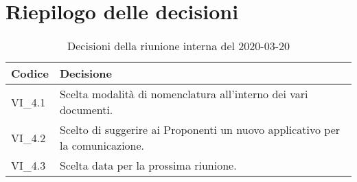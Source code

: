 \section{Riepilogo delle decisioni}
\begin{longtable}{ 
	 >{\centering}p{} >{}p{} }
	
	\caption{Decisioni della riunione interna del 2020-03-20}\\	
	
	\textbf{\color{white}Codice} & 
	\textbf{\color{white}Decisione} 
	\tabularnewline  
	\endhead
	
	VI\_4.1 & Scelta modalità di nomenclatura all'interno dei vari documenti. \\
	VI\_4.2 & Scelto di suggerire ai Proponenti un nuovo applicativo per la comunicazione. \\
	VI\_4.3 & Scelta data per la prossima riunione. \\
	
\end{longtable}